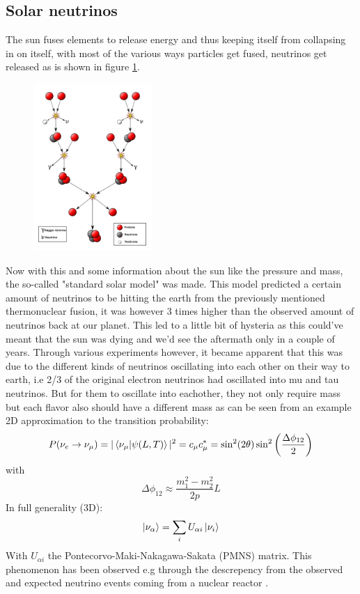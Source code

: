 \documentclass[11pt,a4paper,faculty=we,language=en,doctype=report]{cls/ugent-doc}
\begin{document}
\subsection{Solar neutrinos}
The sun fuses elements to release energy and thus keeping itself from collapsing in 
on itself, with most of the various ways particles get fused, neutrinos get released as 
is shown in figure \ref{fig:SunFusion}.
\begin{figure}
	\centering
	\includegraphics[width=0.4\textwidth]{figures/SunFusion.png}
	\label{fig:SunFusion}
\end{figure}
Now with this and some information about the sun like the pressure and mass,
the so-called "standard solar model" was made. This model predicted a certain
amount of neutrinos to be hitting the earth from the previously mentioned
thermonuclear fusion, it was however 3 times higher than the observed amount of
neutrinos back at our planet. This led to a little bit of hysteria as this could've meant
that the sun was dying and we'd see the aftermath only in a couple of years.
Through various experiments however, it became apparent that this was due to
the different kinds of neutrinos oscillating into each other on their way to
earth, i.e 2/3 of the original electron neutrinos had oscillated into mu and
tau neutrinos. But for them to oscillate into eachother, they not
only require mass but each flavor also should have a different mass as can be seen
from an example 2D approximation to the transition probability:
\begin{equation}
	P(\nu_e\rightarrow\nu_\mu) = |\braket{\nu_\mu|\psi(L,T)}|^2 = c_\mu c_\mu^* = \sin ^2(2 \theta) \sin ^2\left(\frac{\Delta \phi_{12}}{2}\right)
\end{equation}
with
\begin{equation}
	\Delta \phi_{12} \approx \frac{m_1^2 - m_2^2}{2p}L
\end{equation}
In full generality (3D):
\begin{equation}
	\ket{\nu_\alpha} = \sum_iU_{\alpha i} \ket{\nu_i}
\end{equation}
With $U_{\alpha i}$ the Pontecorvo-Maki-Nakagawa-Sakata (PMNS) matrix. 
This phenomenon has been observed e.g through the descrepency from the observed
and expected neutrino events coming from a nuclear reactor \cite{Eguchi_2003}.
\end{document}
